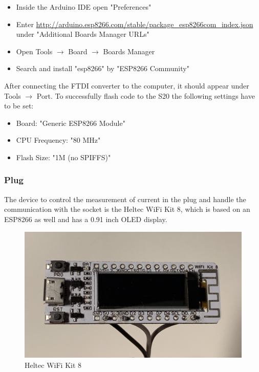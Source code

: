 \begin{itemize}
    \item Inside the Arduino IDE open "Preferences"
    \item Enter \url{http://arduino.esp8266.com/stable/package_esp8266com_index.json} under "Additional Boards Manager URLs"
    \item Open Tools $\rightarrow$ Board $\rightarrow$ Boards Manager
    \item Search and install "esp8266" by "ESP8266 Community"
\end{itemize}

After connecting the FTDI converter to the computer, it should appear under Tools $\rightarrow$ Port. To successfully flash code to the S20 the following settings have to be set:

\begin{itemize}
    \item Board: "Generic ESP8266 Module"
    \item CPU Frequency: "80 MHz"
    \item Flash Size: "1M (no SPIFFS)"
\end{itemize}
\leavevmode

\subsubsection{Plug}
The device to control the measurement of current in the plug and handle the communication with the socket is the Heltec WiFi Kit 8, which is based on an ESP8266 as well and has a 0.91 inch OLED display.
\\
\begin{figure}[h]
    \includegraphics[width=\textwidth]{img/heltec.jpg}
    \caption{Heltec WiFi Kit 8}
    \label{fig:heltec}
\end{figure}

